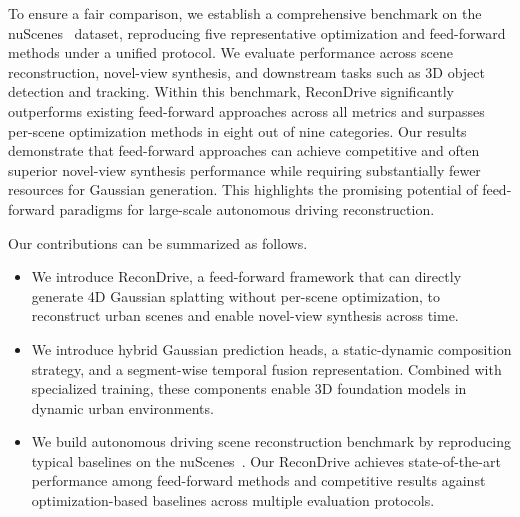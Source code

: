 To ensure a fair comparison, we establish a comprehensive benchmark on the nuScenes~\cite{caesar2020nuscenes} dataset, reproducing five representative optimization and feed-forward methods under a unified protocol. We evaluate performance across scene reconstruction, novel-view synthesis, and downstream tasks such as 3D object detection and tracking. Within this benchmark, ReconDrive significantly outperforms existing feed-forward approaches across all metrics and surpasses per-scene optimization methods in eight out of nine categories. Our results demonstrate that feed-forward approaches can achieve competitive and often superior novel-view synthesis performance while requiring substantially fewer resources for Gaussian generation. This highlights the promising potential of feed-forward paradigms for large-scale autonomous driving reconstruction.

Our contributions can be summarized as follows.
\begin{itemize}[leftmargin=9pt]
\item We introduce ReconDrive, a feed-forward framework that can directly generate 4D Gaussian splatting without per-scene optimization, to reconstruct urban scenes and enable novel-view synthesis across time.
\item We introduce hybrid Gaussian prediction heads, a static-dynamic composition strategy, and a segment-wise temporal fusion representation. Combined with specialized training, these components enable 3D foundation models in dynamic urban environments.
\item We build autonomous driving scene reconstruction benchmark by reproducing typical baselines on the nuScenes~\cite{caesar2020nuscenes}. Our ReconDrive achieves state-of-the-art performance among feed-forward methods and competitive results against optimization-based baselines across multiple evaluation protocols.
\end{itemize}